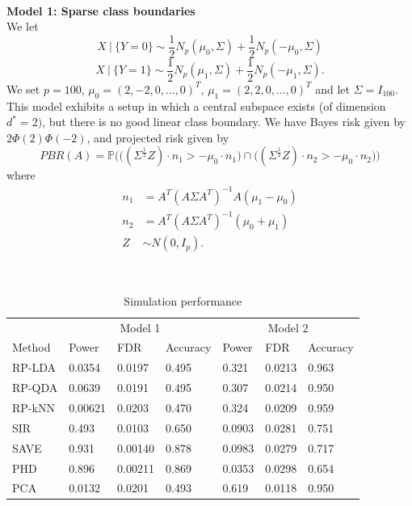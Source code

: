 \documentclass[12pt]{article}
\begin{document}
~\\

\noindent\textbf{Model 1: Sparse class boundaries}\\
We let 
\[X \ | \ \{Y = 0\} \sim \frac{1}{2}N_p(\mu_0, \Sigma) + \frac{1}{2}N_p(-\mu_0, \Sigma) \]
\[X \ | \ \{ Y = 1\} \sim \frac{1}{2}N_p(\mu_1, \Sigma) + \frac{1}{2}N_p(-\mu_1, \Sigma). \]
We set $p=100$, $\mu_0 = (2, -2, 0, \ldots, 0)^T$, $\mu_1 = (2, 2, 0, \ldots, 0)^T$ and let $\Sigma = I_{100}$. This model exhibits a setup in which a central subspace exists (of dimension $d^* = 2)$, but there is no good linear class boundary. We have Bayes risk given by $2\Phi(2)\Phi(-2)$, and projected risk given by 
\[ PBR(A) = \mathbb{P}\Big( \big((\Sigma^{\frac{1}{2}}Z) \cdot n_1 > - \mu_0 \cdot n_1 \big)  \cap \big( (\Sigma^{\frac{1}{2}}Z) \cdot n_2 > - \mu_0 \cdot n_2 \big) \Big) \]
where 
\begin{align*}
    n_1 & = A^T(A\Sigma A^T)^{-1}A(\mu_1 - \mu_0) \\
    n_2 & = A^T(A \Sigma A^T)^{-1} (\mu_0 + \mu_1) \\
    Z & \sim N(0, I_p).
\end{align*}

~\\

\begin{table}
  \caption{Simulation performance}
  \label{sample-table}
  \centering
  \begin{tabular}{l|lll|lll}
    \toprule
    & \multicolumn{3}{c}{Model 1} & \multicolumn{3}{c}{Model 2}                     \\
    \cmidrule(r){1-7}
    Method     & Power     & FDR & Accuracy &  Power     & FDR & Accuracy   \\
   
    \midrule
    RP-LDA & 0.0354 & 0.0197  &  0.495 & 0.321 &   0.0213 & 0.963 \\
    RP-QDA & 0.0639  & 0.0191 & 0.495 & 0.307 &    0.0214 & 0.950 \\
    RP-kNN & 0.00621  & 0.0203 & 0.470 & 0.324 &   0.0209 & 0.959 \\
    SIR & 0.493 &  0.0103 & 0.650 &  0.0903 &      0.0281 & 0.751 \\
    SAVE & 0.931 & 0.00140 & 0.878 & 0.0983 &      0.0279 & 0.717 \\
    PHD & 0.896 & 0.00211 & 0.869 & 0.0353 &       0.0298 & 0.654 \\
    PCA & 0.0132 & 0.0201 & 0.493 & 0.619 &        0.0118 & 0.950 \\
    \bottomrule
  \end{tabular}
\end{table}
\end{document}
